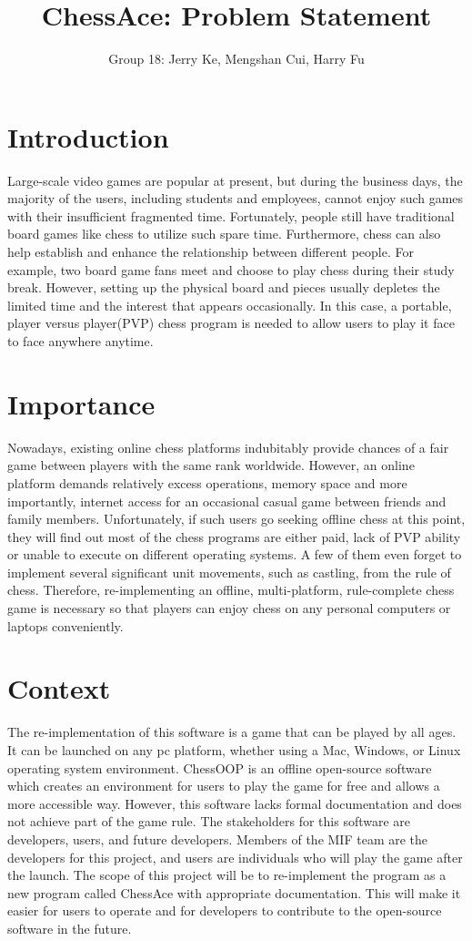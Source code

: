 \documentclass[12pt,letterpaper]{article}
\title{ChessAce: Problem Statement}
\author{Group 18: Jerry Ke, Mengshan Cui, Harry Fu}
\date{}
\begin{document}
\maketitle
\section{Introduction}
Large-scale video games are popular at present, but during the business days, the majority of the users, including students and employees, cannot enjoy such games with their insufficient fragmented time. Fortunately, people still have traditional board games like chess to utilize such spare time. Furthermore, chess can also help establish and enhance the relationship between different people. For example, two board game fans meet and choose to play chess during their study break. However, setting up the physical board and pieces usually depletes the limited time and the interest that appears occasionally. In this case, a portable, player versus player(PVP) chess program is needed to allow users to play it face to face anywhere anytime. 

\section{Importance}
Nowadays, existing online chess platforms indubitably provide chances of a fair game between players with the same rank worldwide. However, an online platform demands relatively excess operations, memory space and more importantly, internet access for an occasional casual game between friends and family members. 
Unfortunately, if such users go seeking offline chess at this point, they will find out most of the chess programs are either paid, lack of PVP ability or unable to execute on different operating systems. A few of them even forget to implement several significant unit movements, such as castling, from the rule of chess. 
Therefore, re-implementing an offline, multi-platform, rule-complete chess game is necessary so that players can enjoy chess on any personal computers or laptops conveniently. 

\section{Context}
The re-implementation of this software is a game that can be played by all ages. It can be launched on any pc platform, whether using a Mac, Windows, or Linux operating system environment. ChessOOP is an offline open-source software which creates an environment for users to play the game for free and allows a more accessible way. However, this software lacks formal documentation and does not achieve part of the game rule. The stakeholders for this software are developers, users, and future developers. Members of the MIF team are the developers for this project, and users are individuals who will play the game after the launch. The scope of this project will be to re-implement the program as a new program called ChessAce with appropriate documentation. This will make it easier for users to operate and for developers to contribute to the open-source software in the future.

\end{document}
